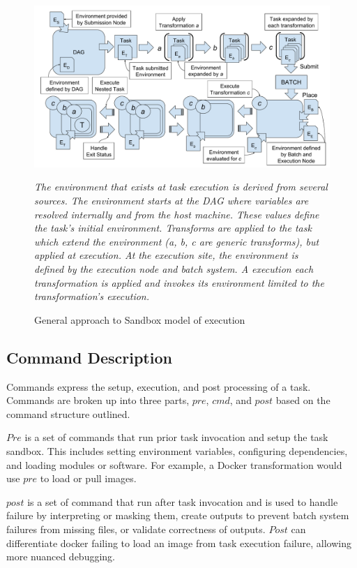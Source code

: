 \documentclass[conference]{IEEEtran}
\begin{document}
\begin{figure}[t]
\includegraphics[width=\textwidth]{graphics/environment_extrapolation_pwrap_ctask_simp.pdf}
\caption{General approach to Sandbox model of execution}
\small
\emph{The environment that exists at task execution is
derived from several sources. 
The environment starts at the DAG where 
variables are resolved internally and from the host machine.
These values define the task's initial environment.
Transforms are applied to the task which extend the
environment (\textit{a, b, c} are generic transforms), 
but applied at execution. 
At the execution site, the environment is
defined by the execution node and batch system.
A execution each transformation is
applied and invokes its environment limited 
to the transformation's execution.}
\label{figure:env-extrap}
\end{figure}



\subsection{Command Description}

Commands express the setup, execution, and post processing
of a task. 
Commands are broken up into three parts, 
${pre}$, ${cmd}$, and ${post}$
based on the command structure outlined.

${Pre}$ is a set of commands that run prior task invocation
and setup the task sandbox. 
This includes setting environment variables, 
configuring dependencies, and loading modules or software.
For example, a Docker transformation would use ${pre}$ to load or pull images. 

${post}$ is a set of command that run after task invocation
and is used to 
handle failure by interpreting or masking them,
create outputs to prevent batch system failures from missing files,
or validate correctness of outputs. 
${Post}$ can differentiate 
docker failing to load an image from
task execution failure, 
allowing more nuanced debugging. 
\end{document}
